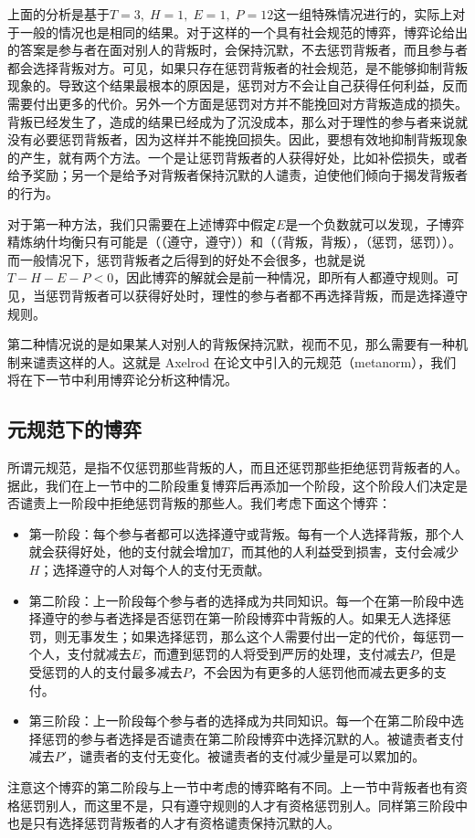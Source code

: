 \documentclass[lang=cn,11pt]{elegantpaper}
\begin{document}
上面的分析是基于$T=3,\;H=1,\;E=1,\;P=12$这一组特殊情况进行的，实际上对于一般的情况也是相同的结果。对于这样的一个具有社会规范的博弈，博弈论给出的答案是参与者在面对别人的背叛时，会保持沉默，不去惩罚背叛者，而且参与者都会选择背叛对方。可见，如果只存在惩罚背叛者的社会规范，是不能够抑制背叛现象的。导致这个结果最根本的原因是，惩罚对方不会让自己获得任何利益，反而需要付出更多的代价。另外一个方面是惩罚对方并不能挽回对方背叛造成的损失。背叛已经发生了，造成的结果已经成为了沉没成本，那么对于理性的参与者来说就没有必要惩罚背叛者，因为这样并不能挽回损失。因此，要想有效地抑制背叛现象的产生，就有两个方法。一个是让惩罚背叛者的人获得好处，比如补偿损失，或者给予奖励；另一个是给予对背叛者保持沉默的人谴责，迫使他们倾向于揭发背叛者的行为。

对于第一种方法，我们只需要在上述博弈中假定$E$是一个负数就可以发现，子博弈精炼纳什均衡只有可能是（（遵守，遵守））和（（背叛，背叛），（惩罚，惩罚））。而一般情况下，惩罚背叛者之后得到的好处不会很多，也就是说$T-H-E-P<0$，因此博弈的解就会是前一种情况，即所有人都遵守规则。可见，当惩罚背叛者可以获得好处时，理性的参与者都不再选择背叛，而是选择遵守规则。

第二种情况说的是如果某人对别人的背叛保持沉默，视而不见，那么需要有一种机制来谴责这样的人。这就是 Axelrod 在论文\cite{Axelrod1986}中引入的元规范（metanorm），我们将在下一节中利用博弈论分析这种情况。

\subsection{元规范下的博弈}
所谓元规范\cite{Axelrod1986}，是指不仅惩罚那些背叛的人，而且还惩罚那些拒绝惩罚背叛者的人。据此，我们在上一节中的二阶段重复博弈后再添加一个阶段，这个阶段人们决定是否谴责上一阶段中拒绝惩罚背叛的那些人。我们考虑下面这个博弈：
\begin{itemize}
	\item 第一阶段：每个参与者都可以选择遵守或背叛。每有一个人选择背叛，那个人就会获得好处，他的支付就会增加$T$，而其他的人利益受到损害，支付会减少$H$；选择遵守的人对每个人的支付无贡献。
	\item 第二阶段：上一阶段每个参与者的选择成为共同知识。每一个在第一阶段中选择遵守的参与者选择是否惩罚在第一阶段博弈中背叛的人。如果无人选择惩罚，则无事发生；如果选择惩罚，那么这个人需要付出一定的代价，每惩罚一个人，支付就减去$E$，而遭到惩罚的人将受到严厉的处理，支付减去$P$，但是受惩罚的人的支付最多减去$P$，不会因为有更多的人惩罚他而减去更多的支付。
	\item 第三阶段：上一阶段每个参与者的选择成为共同知识。每一个在第二阶段中选择惩罚的参与者选择是否谴责在第二阶段博弈中选择沉默的人。被谴责者支付减去$P'$，谴责者的支付无变化。被谴责者的支付减少量是可以累加的。
\end{itemize}
注意这个博弈的第二阶段与上一节中考虑的博弈略有不同。上一节中背叛者也有资格惩罚别人，而这里不是，只有遵守规则的人才有资格惩罚别人。同样第三阶段中也是只有选择惩罚背叛者的人才有资格谴责保持沉默的人。
\end{document}
